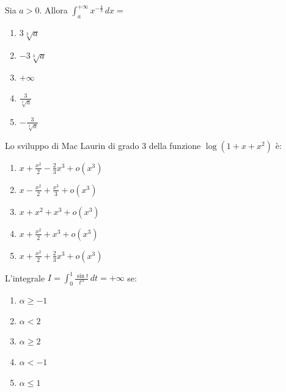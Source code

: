 \begin{quiz}
Sia $a>0$. Allora $\displaystyle\int_a^{+\infty}x^{-\frac43}\,dx=$

\begin{enumerate}
\item $3\sqrt[3]{a}$
\item $-3\sqrt[3]{a}$
\item $+\infty$
\item $\frac{3}{\sqrt[3]{a}}$
\item $-\frac{3}{\sqrt[3]{a}}$
\end{enumerate}
\end{quiz}

\begin{quiz}
Lo sviluppo di Mac Laurin di grado 3 della funzione $\log(1+x+x^2)$ è:

\begin{enumerate}
\item $x+\frac{x^2}{2}-\frac23x^3+o(x^3)$
\item $x-\frac{x^2}{2}+\frac{x^3}{3}+o(x^3)$
\item $x+x^2+x^3+o(x^3)$
\item $x+\frac{x^2}{2}+x^3+o(x^3)$
\item $x+\frac{x^2}{2}+\frac23x^3+o(x^3)$
\end{enumerate}
\end{quiz}

\begin{quiz}
L’integrale $I=\displaystyle\int_0^1\frac{\sin t}{t^\alpha}\,dt=+\infty$ se:

\begin{enumerate}
\item $\alpha\ge-1$
\item $\alpha<2$
\item $\alpha\ge2$
\item $\alpha<-1$
\item $\alpha\le1$
\end{enumerate}
\end{quiz}

